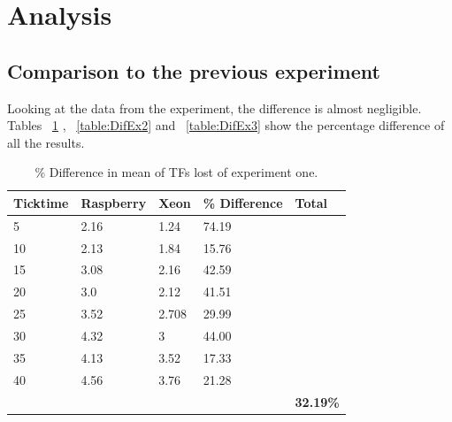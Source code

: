 



\section{Analysis}
\subsection{Comparison to the previous experiment}
Looking at the data from the experiment, the difference is almost negligible. Tables ~\ref{table:DifEx1} , ~\ref{table:DifEx2} and ~\ref{table:DifEx3} show the percentage difference of all the results.

\begin{table}[h!]
\begin{tabular}{| l | l | l | l | l |}
\hline
Ticktime & Raspberry & Xeon & \% Difference & Total \\ \hline
5 & 2.16 & 1.24 & 74.19 & \\ \hline
10 & 2.13 & 1.84 & 15.76 & \\ \hline
15 & 3.08 & 2.16 & 42.59 & \\ \hline
20 & 3.0 & 2.12 & 41.51 & \\ \hline
25 & 3.52 & 2.708 & 29.99 & \\ \hline
30 & 4.32 & 3 & 44.00 & \\ \hline
35 & 4.13 & 3.52 & 17.33 & \\ \hline
40 & 4.56 & 3.76 & 21.28 & \\ \hline
& & & & \textbf{32.19\%} \\ \hline
\end{tabular}
\caption{\% Difference in mean of TFs lost of experiment one.}
\label{table:DifEx1}
\end{table} 

